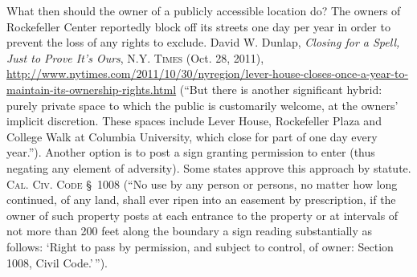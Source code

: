 
What then should the owner of a publicly accessible location do? The owners of
Rockefeller Center reportedly block off its streets one day per year in order to
prevent the loss of any rights to exclude. David W. Dunlap, \emph{Closing for a
Spell, Just to Prove It's Ours}, \textsc{N.Y. Times} (Oct. 28, 2011),
\url{http://www.nytimes.com/2011/10/30/nyregion/lever-house-closes-once-a-year-to-maintain-its-ownership-rights.html}
(``But there is another significant hybrid: purely private space to which the
public is customarily welcome, at the owners' implicit discretion. These spaces
include Lever House, Rockefeller Plaza and College Walk at Columbia University,
which close for part of one day every year.''). Another option is to post a sign
granting permission to enter (thus negating any element of adversity). Some
states approve this approach by statute. \textsc{Cal. Civ. Code} \S~1008 (``No
use by any
person or persons, no matter how long continued, of any land, shall ever ripen
into an easement by prescription, if the owner of such property posts at each
entrance to the property or at intervals of not more than 200 feet along the
boundary a sign reading substantially as follows: `Right to pass by permission,
and subject to control, of owner: Section 1008, Civil Code.'\,'').

